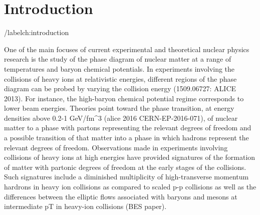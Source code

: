\chapter{Introduction} /label{ch:introduction}

One of the main focuses of current experimental and theoretical nuclear physics research is the study of the phase diagram of nuclear matter at a range of temperatures and baryon chemical potentials. In experiments involving the collisions of heavy ions at relativistic energies, different regions of the phase diagram can be probed by varying the collision energy (1509.06727: ALICE 2013). For instance, the high-baryon chemical potential regime corresponds to lower beam energies. Theories point toward the phase transition, at energy densities above 0.2-1 GeV/fm^3 (alice 2016 CERN-EP-2016-071), of nuclear matter to a phase with partons representing the relevant degrees of freedom and a possible transition of that matter into a phase in which hadrons represent the relevant degrees of freedom. Observations made in experiments involving collisions of heavy ions at high energies have provided signatures of the formation of matter with partonic degrees of freedom at the early stages of the collisions. Such signatures include a diminished multiplicity of high-transverse momentum hardrons in heavy ion collisions as compared to scaled p-p collisions as well as the differences between the elliptic flows associated with baryons and mesons at intermediate pT in heavy-ion collisions (BES paper).
